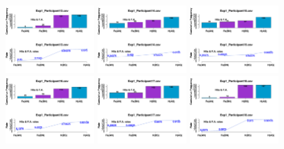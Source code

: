 \begin{figure}[th]
\includegraphics[width=0.30\textwidth]{Figures/MirrorRate_Exp1_P13} \includegraphics[width=0.30\textwidth]{Figures/MirrorRate_Exp1_P14} \includegraphics[width=0.30\textwidth]{Figures/MirrorRate_Exp1_P15}
\includegraphics[width=0.30\textwidth]{Figures/MirrorRate_Exp1_P16} \includegraphics[width=0.30\textwidth]{Figures/MirrorRate_Exp1_P17} \includegraphics[width=0.30\textwidth]{Figures/MirrorRate_Exp1_P18}

\end{figure}
